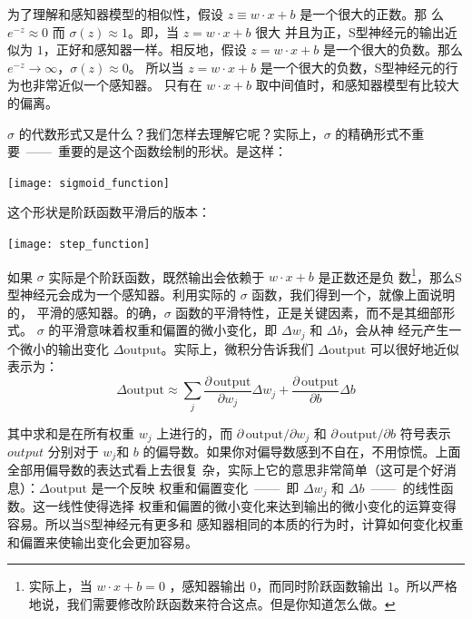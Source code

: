为了理解和感知器模型的相似性，假设 $z \equiv w \cdot x + b$ 是一个很大的正数。那
么 $e^{-z} \approx 0$ 而 $\sigma(z) \approx 1$。即，当 $z = w \cdot x+b$ 很大
并且为正，S型神经元的输出近似为 $1$，正好和感知器一样。相反地，假设 $z = w \cdot
x+b$ 是一个很大的负数。那么 $e^{-z} \rightarrow \infty$，$\sigma(z) \approx 0$。
所以当 $z = w \cdot x +b$ 是一个很大的负数，S型神经元的行为也非常近似一个感知器。
只有在 $w \cdot x+b$ 取中间值时，和感知器模型有比较大的偏离。

$\sigma$ 的代数形式又是什么？我们怎样去理解它呢？实际上，$\sigma$ 的精确形式不重
要~——~重要的是这个函数绘制的形状。是这样：
\begin{center}
  \texttt{[image: sigmoid\_function]}
  \label{fig:SigmoidFunction}
\end{center}

这个形状是阶跃函数平滑后的版本：
\begin{center}
  \texttt{[image: step\_function]}
  \label{fig:StepFunction}
\end{center}

如果 $\sigma$ 实际是个阶跃函数，既然输出会依赖于 $w\cdot x+b$ 是正数还是负
数\footnote{实际上，当 $w \cdot x +b = 0$ ，感知器输出 $0$，而同时阶跃函数输出
  $1$。所以严格地说，我们需要修改阶跃函数来符合这点。但是你知道怎么做。}，那么S
型神经元会成为一个感知器。利用实际的 $\sigma$ 函数，我们得到一个，就像上面说明的，
平滑的感知器。的确，$\sigma$ 函数的平滑特性，正是关键因素，而不是其细部形式。
$\sigma$ 的平滑意味着权重和偏置的微小变化，即 $\Delta w_j$ 和 $\Delta b$，会从神
经元产生一个微小的输出变化 $\Delta \mbox{output}$。实际上，微积分告诉我们
$\Delta \mbox{output}$ 可以很好地近似表示为：
\begin{equation}
  \Delta \mbox{output} \approx \sum_j \frac{\partial \, \mbox{output}}{\partial w_j}
  \Delta w_j + \frac{\partial \, \mbox{output}}{\partial b} \Delta b
  \label{eq:5}\tag{5}
\end{equation}

其中求和是在所有权重 $w_j$ 上进行的，而 $\partial \, \mbox{output} / \partial w_j$ 和
$\partial \, \mbox{output} /\partial b$ 符号表示 $output$ 分别对于 $w_j$和 $b$
的偏导数。如果你对偏导数感到不自在，不用惊慌。上面全部用偏导数的表达式看上去很复
杂，实际上它的意思非常简单（这可是个好消息）：$\Delta \mbox{output}$ 是一个反映
权重和偏置变化~——~即 $\Delta w_j$ 和 $\Delta b$~——~的线性函数。这一线性使得选择
权重和偏置的微小变化来达到输出的微小变化的运算变得容易。所以当S型神经元有更多和
感知器相同的本质的行为时，计算如何变化权重和偏置来使输出变化会更加容易。


